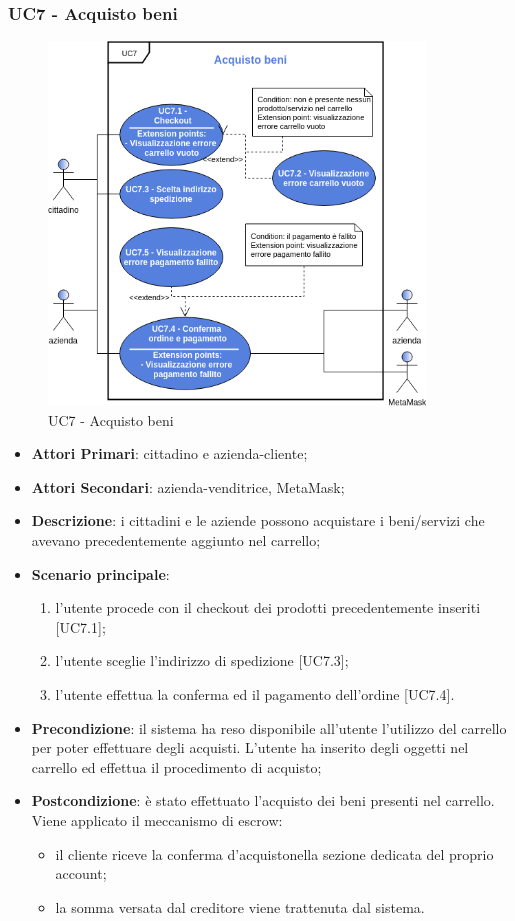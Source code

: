 \subsubsection{UC7 - Acquisto beni}
\begin{figure}[h]
	\includegraphics[width=10cm]{res/images/UC7-Generale.png}
	\centering
	\caption{UC7 - Acquisto beni}
\end{figure}
\begin{itemize}
	\item \textbf{Attori Primari}: cittadino e azienda-cliente;
	\item \textbf{Attori Secondari}: azienda-venditrice, MetaMask\glo;
	\item \textbf{Descrizione}: i cittadini e le aziende possono acquistare i beni/servizi che avevano precedentemente aggiunto nel carrello;
	\item \textbf{Scenario principale}: 
	\begin{enumerate}[label=\alph*.]
		\item l'utente procede con il checkout dei prodotti precedentemente inseriti [UC7.1];
		\item l'utente sceglie l'indirizzo di spedizione [UC7.3];
		\item l'utente effettua la conferma ed il pagamento dell'ordine [UC7.4].
	\end{enumerate}
	
	\item \textbf{Precondizione}: il sistema ha reso disponibile all'utente l'utilizzo del carrello per poter effettuare degli acquisti. L'utente ha inserito degli oggetti nel carrello ed effettua il procedimento di acquisto;
	\item \textbf{Postcondizione}: è stato effettuato l'acquisto dei beni presenti nel carrello. Viene applicato il meccanismo di escrow\glo: 
	\begin{itemize}
		\item il cliente riceve la conferma d'acquisto\glosp nella sezione dedicata del proprio account;
		\item la somma versata dal creditore viene trattenuta dal sistema.
	\end{itemize} 
\end{itemize} 
